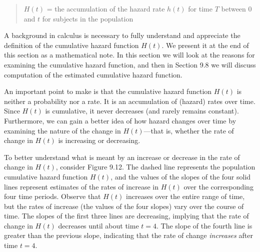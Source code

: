 \documentclass[
]{report}
\begin{document}
\begin{quote}
\(H(t)\) = the accumulation of the hazard rate \(h(t)\) for time \(T\) between 0 and \(t\) for subjects in the population
\end{quote}

A background in calculus is necessary to fully understand and appreciate the definition of the cumulative hazard function \(H(t)\). We present it at the end of this section as a mathematical note. In this section we will look at the reasons for examining the cumulative hazard function, and then in Section 9.8 we will discuss computation of the estimated cumulative hazard function.

An important point to make is that the cumulative hazard function \(H(t)\) is neither a probability nor a rate. It is an accumulation of (hazard) rates over time. Since \(H(t)\) is cumulative, it never decreases (and rarely remains constant). Furthermore, we can gain a better idea of how hazard changes over time by examining the nature of the change in \(H(t)\)---that is, whether the rate of change in \(H(t)\) is increasing or decreasing.

To better understand what is meant by an increase or decrease in the rate of change in \(H(t)\), consider Figure 9.12. The dashed line represents the population cumulative hazard function \(H(t)\), and the values of the slopes of the four solid lines represent estimates of the rates of increase in \(H(t)\) over the corresponding four time periods. Observe that \(H(t)\) increases over the entire range of time, but the rates of increase (the values of the four slopes) vary over the course of time. The slopes of the first three lines are decreasing, implying that the rate of change in \(H(t)\) decreases until about time \(t = 4\). The slope of the fourth line is greater than the previous slope, indicating that the rate of change \emph{increases} after time \(t = 4\).
\end{document}
